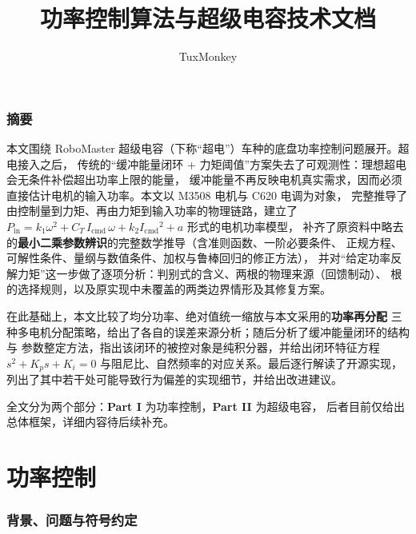 \documentclass[cn,blue,11pt,device=normal]{elegantnote}
\title{功率控制算法与超级电容技术文档}
\author{TuxMonkey}
\institute{\href{https://github.com/TuxMonkey2004/powerctrl-supercap-doc}{github.com/TuxMonkey2004/powerctrl-supercap-doc}}
\date{\zhdate{2026/10/05}}
\newcommand{\Pin}{P_{\mathrm{in}}{}}
\newcommand{\Icmd}{I_{\mathrm{cmd}}{}}
\newcommand{\CT}{C_{T}{}}
\begin{document}
\maketitle

\section*{摘要}

本文围绕 RoboMaster 超级电容（下称“超电”）车种的底盘功率控制问题展开。超电接入之后，
传统的“缓冲能量闭环 + 力矩阈值”方案失去了可观测性：理想超电会无条件补偿超出功率上限的能量，
缓冲能量不再反映电机真实需求，因而必须直接估计电机的输入功率。本文以 M3508 电机与 C620 电调为对象，
完整推导了由控制量到力矩、再由力矩到输入功率的物理链路，建立了
$\Pin = k_1\omega^2 + \CT\,\Icmd\,\omega + k_2\Icmd^2 + a$ 形式的电机功率模型，
补齐了原资料中略去的\textbf{最小二乘参数辨识}的完整数学推导（含准则函数、一阶必要条件、
正规方程、可解性条件、量纲与数值条件、加权与鲁棒回归的修正方法），
并对“给定功率反解力矩”这一步做了逐项分析：判别式的含义、两根的物理来源（回馈制动）、
根的选择规则，以及原实现中未覆盖的两类边界情形及其修复方案。

在此基础上，本文比较了均分功率、绝对值统一缩放与本文采用的\textbf{功率再分配}
三种多电机分配策略，给出了各自的误差来源分析；随后分析了缓冲能量闭环的结构与
参数整定方法，指出该闭环的被控对象是纯积分器，并给出闭环特征方程
$s^2 + K_p s + K_i = 0$ 与阻尼比、自然频率的对应关系。最后逐行解读了开源实现，
列出了其中若干处可能导致行为偏差的实现细节，并给出改进建议。

全文分为两个部分：\textbf{Part I} 为功率控制，\textbf{Part II} 为超级电容，
后者目前仅给出总体框架，详细内容待后续补充。

\medskip

\newpage
{}
{\small
\tableofcontents
}
\newpage

\part{功率控制}

\section{背景、问题与符号约定}
\end{document}
